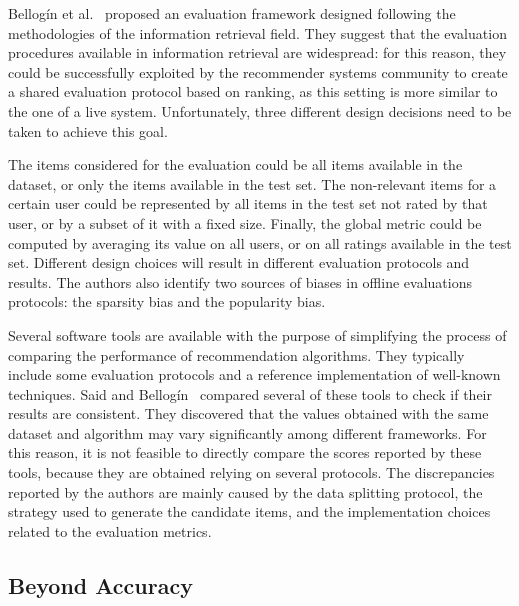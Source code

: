 Bellog\'in et al.~\cite{Bellogin2017} proposed an evaluation framework designed following the methodologies of the information retrieval field. They suggest that the evaluation procedures available in information retrieval are widespread: for this reason, they could be successfully exploited by the recommender systems community to create a shared evaluation protocol based on ranking, as this setting is more similar to the one of a live system. Unfortunately, three different design decisions need to be taken to achieve this goal.

The items considered for the evaluation could be all items available in the dataset, or only the items available in the test set. The non-relevant items for a certain user could be represented by all items in the test set not rated by that user, or by a subset of it with a fixed size. Finally, the global metric could be computed by averaging its value on all users, or on all ratings available in the test set. Different design choices will result in different evaluation protocols and results. The authors also identify two sources of biases in offline evaluations protocols: the sparsity bias and the popularity bias.

Several software tools are available with the purpose of simplifying the process of comparing the performance of recommendation algorithms. They typically include some evaluation protocols and a reference implementation of well-known techniques. Said and Bellog\'in~\cite{Said2014} compared several of these tools to check if their results are consistent. They discovered that the values obtained with the same dataset and algorithm may vary significantly among different frameworks. For this reason, it is not feasible to directly compare the scores reported by these tools, because they are obtained relying on several protocols. The discrepancies reported by the authors are mainly caused by the data splitting protocol, the strategy used to generate the candidate items, and the implementation choices related to the evaluation metrics.

\subsection{Beyond Accuracy}
\label{soa:sec:beyond}


